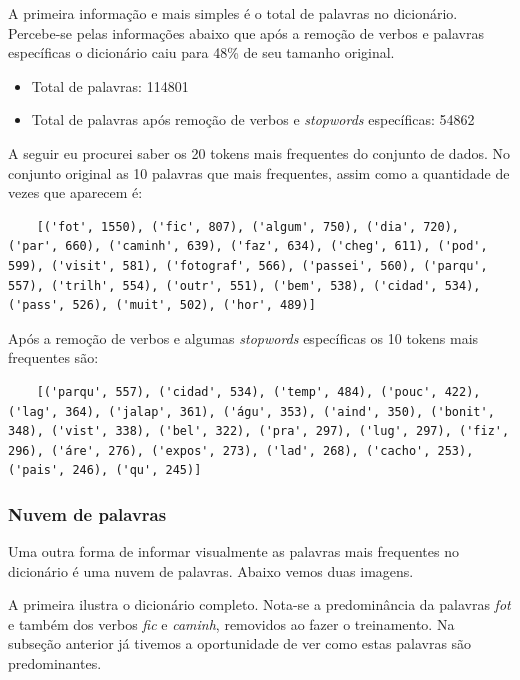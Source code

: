 A primeira informação e mais simples é o total de palavras no dicionário. Percebe-se pelas informações abaixo que após a remoção de verbos 
e palavras específicas o dicionário caiu para 48\% de seu tamanho original.

\begin{itemize}
    \item Total de palavras: 114801
    \item Total de palavras após remoção de verbos e \textit{stopwords} específicas: 54862
\end{itemize}

A seguir eu procurei saber os 20 tokens mais frequentes do conjunto de dados. No conjunto original as 10 palavras que mais frequentes, 
assim como a quantidade de vezes que aparecem é:

\begin{lstlisting}
    [('fot', 1550), ('fic', 807), ('algum', 750), ('dia', 720), ('par', 660), ('caminh', 639), ('faz', 634), ('cheg', 611), ('pod', 599), ('visit', 581), ('fotograf', 566), ('passei', 560), ('parqu', 557), ('trilh', 554), ('outr', 551), ('bem', 538), ('cidad', 534), ('pass', 526), ('muit', 502), ('hor', 489)]
\end{lstlisting}

Após a remoção de verbos e algumas \textit{stopwords} específicas os 10 tokens mais frequentes são:

\begin{lstlisting}
    [('parqu', 557), ('cidad', 534), ('temp', 484), ('pouc', 422), ('lag', 364), ('jalap', 361), ('águ', 353), ('aind', 350), ('bonit', 348), ('vist', 338), ('bel', 322), ('pra', 297), ('lug', 297), ('fiz', 296), ('áre', 276), ('expos', 273), ('lad', 268), ('cacho', 253), ('pais', 246), ('qu', 245)]
\end{lstlisting}

\subsubsection{Nuvem de palavras}

Uma outra forma de informar visualmente as palavras mais frequentes no dicionário é uma nuvem de palavras. Abaixo vemos duas imagens.

A primeira ilustra o dicionário completo. Nota-se a predominância da palavras \textit{fot} e também dos verbos \textit{fic} e \textit{caminh}, removidos
ao fazer o treinamento. Na subseção anterior já tivemos a oportunidade de ver como estas palavras são predominantes.

